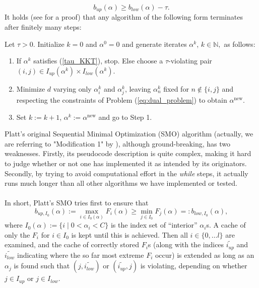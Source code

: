 \begin{equation*}\label{tau_KKT}
b_{up}(\alpha) \geq b_{low}(\alpha) - \tau.
\end{equation*}
It holds (see \cite{Keerthi2002} for a proof) that any algorithm of the following form terminates after finitely many steps:
\begin{algorithm}\label{GSMO} Let $\tau > 0$. Initialize $k = 0 $ and $\alpha^0 = 0$ and generate iterates $\alpha^k$, $k \in \mathbb{N},$ as follows: 
\begin{enumerate}
\item If $\alpha^k$ satisfies (\ref{tau_KKT}), stop. Else choose a $\tau$-violating pair $(i,j) \in I_{up}(\alpha^k) \times I_{low}(\alpha^k)$.
\item Minimize $d$ varying only $\alpha^k_i$ and $\alpha^k_j$, leaving $\alpha^k_n$ fixed for $n \notin \{i,j\}$ and respecting the constraints of Problem (\ref{eq:dual_problem}) to obtain $\alpha^{\text{new}}$.
\item Set $k := k+1$, $\alpha^k := \alpha^{\text{new}}$ and go to Step 1.
\end{enumerate}
\end{algorithm} 
Platt's original Sequential Minimal Optimization (SMO) algorithm (actually, we are referring to "Modification 1" by \cite{KeerthiShevade}), although ground-breaking, has two weaknesses. Firstly, its pseudocode description is quite complex, making it hard to judge whether or not one has implemented it as intended by its originators. Secondly, by trying to avoid computational effort in the \textit{while} steps, it actually runs much longer than all other algorithms we have implemented or tested.\\\\
In short, Platt's SMO tries first to ensure that
\[
b_{up,I_0}(\alpha) := \max_{i \in I_0(\alpha)} F_i(\alpha) \geq \min_{j \in I_0} F_j(\alpha) =: b_{low,I_0}(\alpha),
\]
where $I_0(\alpha) := \{ i  \mid  0 < \alpha_i < C \}$ is the index set of ``interior'' $\alpha_i$s. A cache of only the $F_i$ for $i \in I_0$ is kept until this is achieved. Then all $i \in \{0,\ldots l\}$ are examined, and the cache of correctly stored $F_i$s (along with the indices $\widetilde{i_{up}}$ and $\widetilde{i_{low}}$ indicating where the so far most extreme $F_i$ occur) is extended as long as an $\alpha_j$ is found such that $(j,\widetilde{i_{low}})$ or $(\widetilde{i_{up}},j)$ is violating, depending on whether $j \in I_{up}$ or $j \in I_{low}$.\\\\
